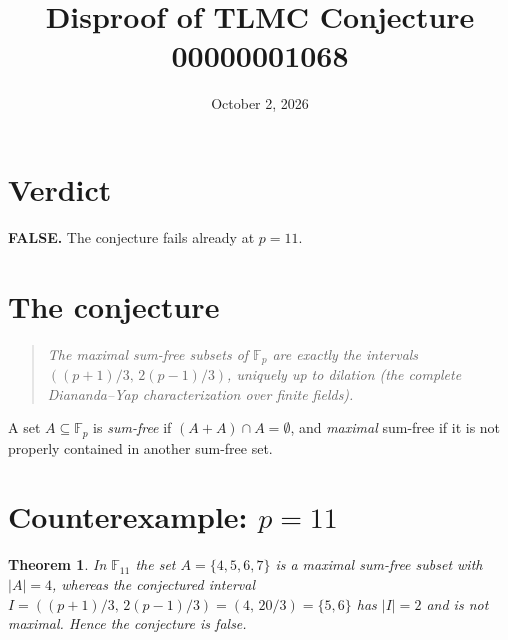 \documentclass[11pt]{article}
\title{Disproof of TLMC Conjecture 00000001068}
\author{}
\date{October 2, 2026}
\newtheorem{theorem}{Theorem}
\newcommand{\F}{\mathbb{F}}
\begin{document}
\maketitle

\section*{Verdict}
\textbf{FALSE.} The conjecture fails already at $p = 11$.

\section{The conjecture}

\begin{quote}
\textit{The maximal sum-free subsets of $\F_p$ are exactly the intervals
$((p+1)/3,\, 2(p-1)/3)$, uniquely up to dilation (the complete
Diananda--Yap characterization over finite fields).}
\end{quote}

A set $A \subseteq \F_p$ is \emph{sum-free} if $(A + A) \cap A = \emptyset$,
and \emph{maximal} sum-free if it is not properly contained in another
sum-free set.

\section{Counterexample: \texorpdfstring{$p = 11$}{p = 11}}

\begin{theorem}\label{thm:main}
In $\F_{11}$ the set $A = \{4,5,6,7\}$ is a maximal sum-free subset with
$|A| = 4$, whereas the conjectured interval
$I = ((p+1)/3,\, 2(p-1)/3) = (4,\, 20/3) = \{5,6\}$ has $|I| = 2$ and is not
maximal. Hence the conjecture is false.
\end{theorem}
\end{document}
